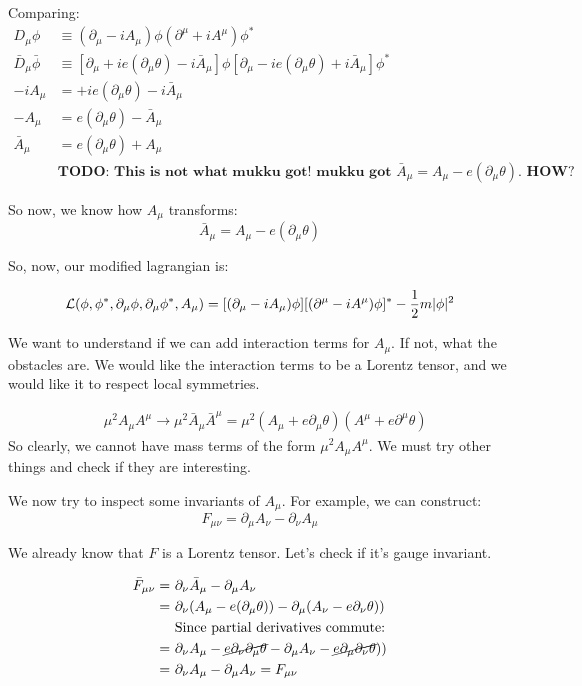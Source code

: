 Comparing:
\begin{align*}
    D_\mu \phi &\equiv (\partial_\mu - i A_\mu) \phi (\partial^\mu + i A^\mu) \phi^* \\
    \bar D_\mu \bar \phi &\equiv [\partial_\mu + i e (\partial_\mu \theta) - i \bar A_\mu  ]\phi
    [\partial_\mu  - i e (\partial_\mu \theta)  + i \bar A_\mu ] \phi^* \\
    -i A_\mu &= + i e (\partial_\mu \theta) - i \bar A_\mu \\
    -A_\mu &= e (\partial_\mu \theta) - \bar A_\mu \\
    \bar A_\mu &= e (\partial_\mu \theta) + A_\mu \\
   &\textbf{TODO: This is not what mukku got! mukku got $\bar A_\mu = A_\mu - e(\partial_\mu \theta)$. HOW?}
\end{align*}

So now, we know how $A_\mu$ transforms:
\begin{equation}
    \boxed{\bar A_\mu = A_\mu - e(\partial_\mu \theta)}
\end{equation}

So, now, our modified lagrangian is:

\begin{align*}
    \mathcal{L} (\phi, \phi^*, \partial_\mu \phi, \partial_\mu \phi^*, A_\mu) =
    [(\partial_\mu - i A_\mu) \phi][(\partial^\mu - i A^\mu) \phi]^* - \frac{1}{2} m |\phi|^2
\end{align*}



We want to understand if we can add interaction terms for $A_\mu$. If not,
what the obstacles are. We would like the interaction terms to be a Lorentz
tensor, and we would like it to respect local symmetries.

\begin{align*}
    &\mu^2 A_\mu A^\mu \to \mu^2 \bar A_\mu \bar A^\mu = \mu^2 (A_\mu + e \partial_\mu \theta) (A^\mu + e \partial^\mu \theta)
\end{align*}
So clearly, we cannot have mass terms of the form $\mu^2 A_\mu A^\mu$. We must
try other things and check if they are interesting.

We now try to inspect some invariants of $A_\mu$.  For example, we can
construct:
$$F_{\mu\nu} = \partial_\mu A_\nu - \partial_\nu A_\mu$$

We already know that $F$ is a Lorentz tensor. Let's check if it's gauge
invariant.

\begin{align*}
    \bar F_{\mu\nu} =~&\partial_\nu \bar A_\mu - \partial_\mu A_\nu \\
    =~&\partial_\nu(A_\mu - e (\partial_\mu \theta)) - \partial_\mu (A_\nu - e \partial_\nu \theta)) \\
      &\text{Since partial derivatives commute:} \\
    =~&\partial_\nu A_\mu - \cancel{e \partial_\nu \partial_\mu \theta} - \partial_\mu A_\nu - \cancel{e \partial_\mu \partial_\nu \theta})) \\
    =~&\partial_\nu A_\mu - \partial_\mu A_\nu = F_{\mu \nu}
\end{align*}

